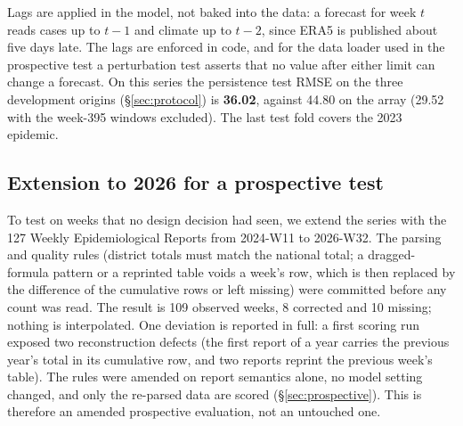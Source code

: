 Lags are applied in the model, not baked into the data: a forecast for week $t$
reads cases up to $t-1$ and climate up to $t-2$, since ERA5 is published about
five days late. The lags are enforced in code, and for the data loader used in the
prospective test a perturbation test asserts that no value after either limit can
change a forecast. On this series the persistence test RMSE on the three
development origins (\S\ref{sec:protocol}) is \textbf{36.02}, against 44.80 on the
array (29.52 with the week-395 windows excluded). The last test fold covers the
2023 epidemic.

\subsection{Extension to 2026 for a prospective test}
\label{sec:newweeks}
To test on weeks that no design decision had seen, we extend the series with the 127
Weekly Epidemiological Reports from 2024-W11 to 2026-W32. The parsing and quality
rules (district totals must match the national total; a dragged-formula pattern
or a reprinted table voids a week's row, which is then replaced by the difference of
the cumulative rows or left missing) were committed before any count was read. The
result is 109 observed weeks, 8 corrected and 10 missing; nothing is interpolated.
One deviation is reported in full: a first scoring run exposed two reconstruction
defects (the first report of a year carries the previous year's total in its
cumulative row, and two reports reprint the previous week's table). The rules were
amended on report semantics alone, no model setting changed, and only the
re-parsed data are scored (\S\ref{sec:prospective}). This is therefore an amended
prospective evaluation, not an untouched one.
